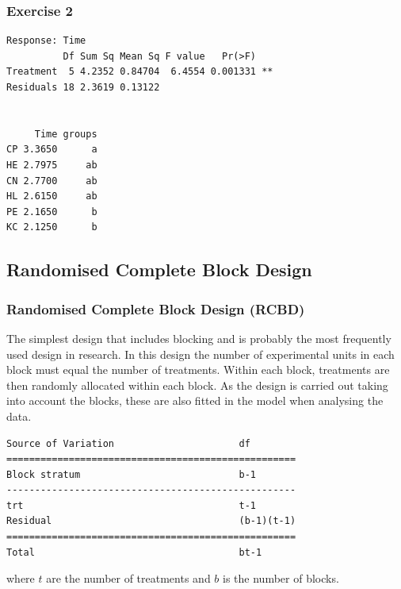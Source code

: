 \begin{frame}[fragile]\frametitle{Exercise 2}
\begin{verbatim}
Response: Time
          Df Sum Sq Mean Sq F value   Pr(>F)
Treatment  5 4.2352 0.84704  6.4554 0.001331 **
Residuals 18 2.3619 0.13122


     Time groups
CP 3.3650      a
HE 2.7975     ab
CN 2.7700     ab
HL 2.6150     ab
PE 2.1650      b
KC 2.1250      b
\end{verbatim}
\end{frame}

\subsection{Randomised Complete Block Design}
\begin{frame}[fragile]\frametitle{Randomised Complete Block Design (RCBD)}
The simplest design that includes blocking and is probably the most
frequently used design in research. In this design the number of experimental units in each block must equal the number
of treatments. Within each block, treatments are then randomly allocated within each block. As the design is carried
out taking into account the blocks, these are also fitted in the model when analysing the data.

\begin{verbatim}
Source of Variation                      df
===================================================
Block stratum                            b-1
---------------------------------------------------
trt                                      t-1
Residual                                 (b-1)(t-1)
===================================================
Total                                    bt-1
\end{verbatim}

where $t$ are the number of treatments and $b$ is the number of blocks.

\end{frame}



